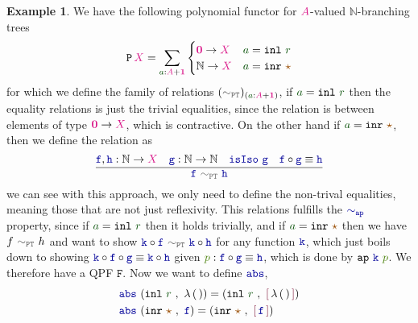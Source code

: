 \documentclass[twoside,11pt,openright]{report}
\theoremstyle{plain} %
\theoremstyle{definition}
\newtheorem{exmp}{Example} %
\theoremstyle{remark}
\newcommand*{\term}[1]{\textcolor{green!30!black}{#1}} %
\newcommand*{\pathterm}[1]{\textcolor{green!65!red!75!black}{#1}}
\newcommand*{\type}[1]{\textcolor{magenta!90!black}{#1}}
\newcommand*{\unit}{\type{\textbf{1}}}
\newcommand*{\empt}{\type{\textbf{0}}}
\newcommand*{\relation}[1]{\textcolor{gray!75!black}{\ensuremath{\mathtt{#1}}}}
\newcommand*{\constant}[1]{\textcolor{orange!60!black}{\ensuremath{\mathtt{#1}}}}
\newcommand*{\function}[1]{\textcolor{blue!60!black}{\ensuremath{\mathtt{#1}}}}
\newcommand*{\constructor}[1]{\textcolor{purple!60!black}{\ensuremath{\mathtt{#1}}}}
\newcommand*{\functor}[1]{\ensuremath{\mathbf{\mathtt{#1}}}}
\newcommand*{\unitelem}{\constant{\star}} %
\newcommand*{\quotientconstructor}[1]{\constructor{[}\,#1\,\constructor{]}}
\begin{document}
\begin{exmp}
  We have the following polynomial functor for \(\type{A}\)-valued \(\mathbb{N}\)-branching trees
  \begin{equation}
    \functor{P}\,\type{X} = \sum_{\term{a} : \type{A} + \unit} \begin{cases} \empt \rightarrow \type{X} & \term{a} = \mathtt{inl}~\term{r} \\ \mathbb{N} \rightarrow \type{X} & \term{a} = \mathtt{inr}~\unitelem \end{cases}
  \end{equation}
  for which we define the family of relations \((\relation{\sim_{PT}})_{(\term{a} : \type{A} + \unit)}\), if \(\term{a} = \mathtt{inl}~\term{r}\) then the equality relations is just the trivial equalities, since the relation is between elements of type \(\empt \rightarrow \type{X}\), which is contractive. On the other hand if \(\term{a} = \mathtt{inr}~\unitelem\), then we define the relation as
  \begin{equation}
    \vcenter{\infer{\function{f}~\relation{\sim_{PT}}~\function{h}}{\function{f}, \function{h} : \mathbb{N} \rightarrow \type{X} & \function{g} : \mathbb{N} \rightarrow \mathbb{N} & \function{isIso}~\function{g} & \function{f} \circ \function{g} \equiv \function{h}}}
  \end{equation}
  we can see with this approach, we only need to define the non-trival equalities, meaning those that are not just reflexivity. This relations fulfills the \(\function{\sim_{ap}}\) property, since if \(\term{a} = \mathtt{inl}~\term{r}\) then it holds trivially, and if \(\term{a} = \mathtt{inr}~\unitelem\) then we have \(f~\relation{\sim_{PT}}~h\) and want to show \(\function{k} \circ \function{f}~\relation{\sim_{PT}}~\function{k} \circ \function{h}\) for any function \(\function{k}\), which just boils down to showing \(\function{k} \circ \function{f} \circ \function{g} \equiv \function{k} \circ \function{h}\) given \(\pathterm{p} : \function{f} \circ \function{g} \equiv \function{h}\), which is done by \(\mathtt{ap}~\function{k}~\pathterm{p}\). We therefore have a QPF \(\functor{F}\). Now we want to define \(\function{abs}\),
  \begin{equation}
    \begin{aligned}
      &\function{abs}~(\mathtt{inl}~\term{r}~,~\lambda\,(\,)) = (\mathtt{inl}~\term{r}~,~\quotientconstructor{\lambda\,(\,)}) \\
      &\function{abs}~(\mathtt{inr}~\unitelem~,~\function{f}) = (\mathtt{inr}~\unitelem~,~\quotientconstructor{\function{f}})

\end{aligned}
\end{equation}
\end{exmp}
\end{document}

